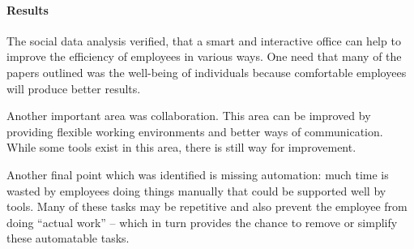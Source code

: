 \paragraph{Results}
The social data analysis verified, that a smart and interactive office can help to improve the 
efficiency of employees in various ways. One need that many of the papers outlined was the 
well-being of individuals because comfortable employees will produce better results.

Another important area was collaboration. This area can be improved by providing flexible working 
environments and better ways of communication. While some tools exist in this area, there is still 
way for improvement. 

Another final point which was identified is missing automation: much time is wasted by employees 
doing things manually that could be supported well by tools. Many of these tasks may be repetitive 
and also prevent the employee from doing ``actual work'' -- which in turn provides the chance to 
remove or simplify these automatable tasks.
